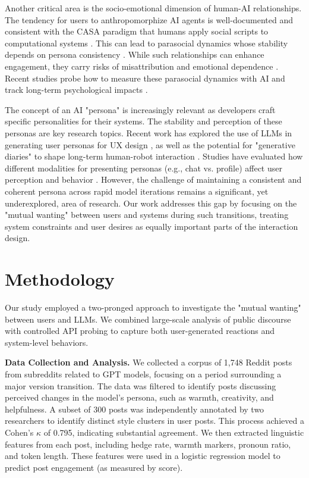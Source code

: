 \documentclass{article}
\begin{document}
Another critical area is the socio-emotional dimension of human-AI relationships. The tendency for users to anthropomorphize AI agents is well-documented \citep{epley2007seeing} and consistent with the CASA paradigm that humans apply social scripts to computational systems \citep{nass2000machines}. This can lead to parasocial dynamics \citep{horton1956mass} whose stability depends on persona consistency \citep{rashkin2018empathetic, zhong2020pec}. While such relationships can enhance engagement, they carry risks of misattribution and emotional dependence \citep{pnas2025anthro, maeda2024parasocial}. Recent studies probe how to measure these parasocial dynamics with AI \citep{omeish2025between, qi2025assistant} and track long-term psychological impacts \citep{payne2024ai, xie2022ai}.

The concept of an AI "persona" is increasingly relevant as developers craft specific personalities for their systems. The stability and perception of these personas are key research topics. Recent work has explored the use of LLMs in generating user personas for UX design \citep{hur2024utilizing}, as well as the potential for "generative diaries" to shape long-term human-robot interaction \citep{cho2023story}. Studies have evaluated how different modalities for presenting personas (e.g., chat vs. profile) affect user perception and behavior \citep{kaate2025evaluating, kaate2025fourth}. However, the challenge of maintaining a consistent and coherent persona across rapid model iterations remains a significant, yet underexplored, area of research. Our work addresses this gap by focusing on the "mutual wanting" between users and systems during such transitions, treating system constraints and user desires as equally important parts of the interaction design.

\section{Methodology}
Our study employed a two-pronged approach to investigate the "mutual wanting" between users and LLMs. We combined large-scale analysis of public discourse with controlled API probing to capture both user-generated reactions and system-level behaviors. 

\textbf{Data Collection and Analysis.} We collected a corpus of 1,748 Reddit posts from subreddits related to GPT models, focusing on a period surrounding a major version transition. The data was filtered to identify posts discussing perceived changes in the model's persona, such as warmth, creativity, and helpfulness. A subset of 300 posts was independently annotated by two researchers to identify distinct style clusters in user posts. This process achieved a Cohen's $\kappa$ of 0.795, indicating substantial agreement. We then extracted linguistic features from each post, including hedge rate, warmth markers, pronoun ratio, and token length. These features were used in a logistic regression model to predict post engagement (as measured by score).
\end{document}
